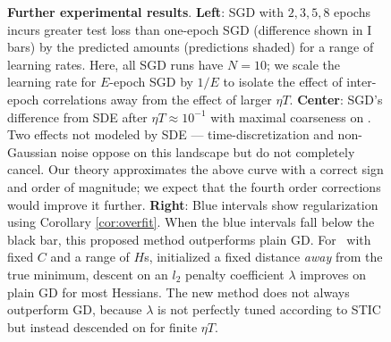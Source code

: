         \begin{figure}[h] 
            \centering
            \centering
            \caption{
                \textbf{Further experimental results}.
                \textbf{Left}: SGD with $2, 3, 5, 8$ epochs incurs greater test
                loss than one-epoch SGD (difference shown in I bars) by the
                predicted amounts (predictions shaded) for a range of learning
                rates.  Here, all SGD runs have $N=10$; we scale the learning
                rate for $E$-epoch SGD by $1/E$ to isolate the effect of
                inter-epoch correlations away from the effect of larger $\eta
                T$.
                \textbf{Center}: SGD's difference from SDE after $\eta T
                \approx 10^{-1}$ with maximal coarseness on \Gauss.  Two
                effects not modeled by SDE --- time-discretization and
                non-Gaussian noise oppose on this landscape but do not
                completely cancel.  Our theory approximates the above curve
                with a correct sign and order of magnitude; we expect that the
                fourth order corrections would improve it further.
                \textbf{Right}: Blue intervals show regularization using Corollary
                \ref{cor:overfit}.  When the blue intervals fall below the
                black bar, this proposed method outperforms plain GD.  For
                \MeanEstimation\ with fixed $C$ and a range of $H$s, initialized
                a fixed distance \emph{away} from the true minimum, descent on
                an $l_2$ penalty coefficient $\lambda$ improves on plain GD for
                most Hessians.  The new method does not always outperform GD,
                because $\lambda$ is not perfectly tuned according to STIC but
                instead descended on for finite $\eta T$.
            }
            \label{fig:takreg}
        \end{figure}


